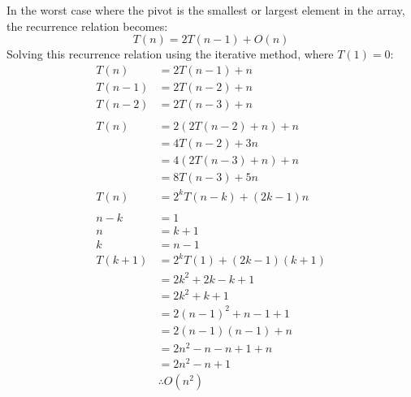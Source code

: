 \documentclass[12pt letter]{report}
\begin{document}
In the worst case where the pivot is the smallest or largest element in the array, the recurrence relation becomes:
\[
  T \left( n \right)  = 2 T \left( n - 1 \right) + O \left( n \right)
\]
Solving this recurrence relation using the iterative method, where $T \left( 1 \right) = 0$:
\begin{align*}
  T \left( n \right)     & = 2 T \left( n - 1 \right) + n                                          \\
  T \left( n - 1 \right) & = 2 T\left( n - 2 \right) + n                                           \\
  T \left( n - 2 \right) & = 2 T \left( n - 3 \right) + n                                          \\
  \\
  T \left( n \right)     & = 2 \left( 2 T \left( n - 2 \right) + n  \right) + n                    \\
                         & = 4 T \left( n - 2 \right) + 3n                                         \\
                         & = 4 \left( 2 T \left( n - 3 \right) + n  \right) + n                    \\
                         & = 8 T \left( n - 3 \right) + 5n                                         \\
  T \left( n \right)     & = 2^{k} T \left( n - k \right) + \left( 2k - 1 \right)n                 \\
  \\
  n - k                  & = 1                                                                     \\
  n                      & = k + 1                                                                 \\
  k                      & = n - 1                                                                 \\
  T \left( k + 1 \right) & = 2^{k} T \left( 1 \right) + \left( 2k - 1 \right) \left( k + 1 \right) \\
                         & = 2k^2 + 2k - k + 1                                                     \\
                         & = 2k^2 + k + 1                                                          \\
                         & = 2 \left( n - 1 \right)^2 + n - 1 + 1                                  \\
                         & = 2 \left( n-1 \right) \left( n - 1 \right) + n                         \\
                         & = 2n^2 -n -n + 1 + n                                                    \\
                         & = 2n^2 -n + 1                                                           \\
                         & \therefore O \left( n^2 \right)
\end{align*}
\end{document}
